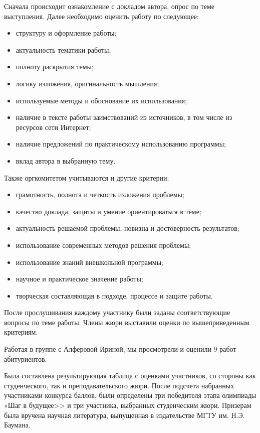 Сначала происходит ознакомление с докладом автора, опрос по теме выступления. 
Далее необходимо оценить работу по следующее:
\begin{itemize}
    \item структуру и оформление работы;
    \item актуальность тематики работы;
    \item полноту раскрытия темы;
    \item логику изложения, оригинальность мышления;
    \item используемые методы и обоснование их использования;
    \item наличие в тексте работы заимствований из источников, в том числе из ресурсов сети Интернет;
    \item наличие предложений по практическому использованию программы;
    \item вклад автора в выбранную тему.
\end{itemize}

Также оргкомитетом учитываются и другие критерии:
\begin{itemize}
    \item грамотность, полнота и четкость изложения проблемы;
    \item качество доклада, защиты и умение ориентироваться в теме;
    \item актуальность решаемой проблемы, новизна и достоверность результатов;
    \item использование современных методов решения проблемы;
    \item использование знаний внешкольной программы;
    \item научное и практическое значение работы;
    \item творческая составляющая в подходе, процессе и защите работы.
\end{itemize}

После прослушивания каждому участнику были заданы соответствующие вопросы по теме работы. Члены жюри выставили оценки по вышеприведенным критериям.

Работая в группе с Алферовой Ириной, мы просмотрели и оценили 9 работ абитуриентов.

Была составлена результирующая таблица с оценками участников, со стороны как студенческого, так и преподавательского жюри. После подсчета набранных участниками конкурса баллов, были определены три победителя этапа олимпиады «Шаг в будущее>> и три участника, выбранных студенческим жюри.
Призерам была вручена научная литература, выпущенная в издательстве МГТУ им. Н.Э. Баумана.